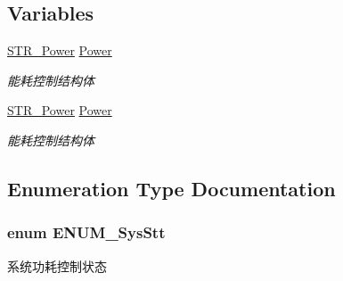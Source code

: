 \subsection*{\-Variables}
\begin{DoxyCompactItemize}
\item 
\hypertarget{group___p_o_w_e_r_gaaecab9adfce41ce80a1ff422608e52b1}{\hyperlink{struct_s_t_r___power}{\-S\-T\-R\-\_\-\-Power} \hyperlink{group___p_o_w_e_r_gaaecab9adfce41ce80a1ff422608e52b1}{\-Power}}\label{group___p_o_w_e_r_gaaecab9adfce41ce80a1ff422608e52b1}

\begin{DoxyCompactList}\small\item\em 能耗控制结构体 \end{DoxyCompactList}\item 
\hypertarget{group___p_o_w_e_r_gaaecab9adfce41ce80a1ff422608e52b1}{\hyperlink{struct_s_t_r___power}{\-S\-T\-R\-\_\-\-Power} \hyperlink{group___p_o_w_e_r_gaaecab9adfce41ce80a1ff422608e52b1}{\-Power}}\label{group___p_o_w_e_r_gaaecab9adfce41ce80a1ff422608e52b1}

\begin{DoxyCompactList}\small\item\em 能耗控制结构体 \end{DoxyCompactList}\end{DoxyCompactItemize}


\subsection{\-Enumeration \-Type \-Documentation}
\hypertarget{group___p_o_w_e_r_ga91eadf2d6779b6b61c085ca51be8e7fd}{
\subsubsection[{\-E\-N\-U\-M\-\_\-\-Sys\-Stt}]{\setlength{\rightskip}{0pt plus 5cm}enum {\bf \-E\-N\-U\-M\-\_\-\-Sys\-Stt}}}\label{group___p_o_w_e_r_ga91eadf2d6779b6b61c085ca51be8e7fd}


系统功耗控制状态 

